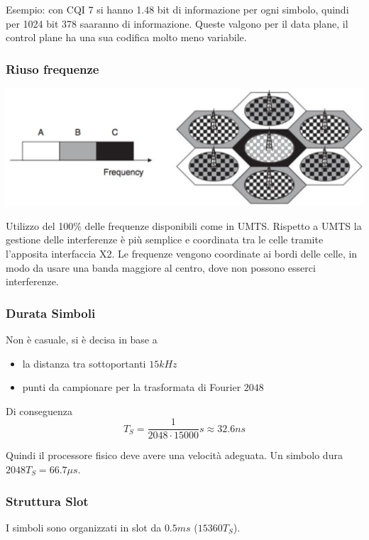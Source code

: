 Esempio: con CQI 7 si hanno 1.48 bit di informazione per ogni simbolo, quindi per 1024 bit 378 saaranno di informazione. Queste valgono per il data plane, il control plane ha una sua codifica molto meno variabile.\\

\newpage

\subsubsection{Riuso frequenze}
\begin{center}
	\includegraphics[width=0.9\linewidth]{img/mobile/riuso4g}
\end{center}
Utilizzo del 100\% delle frequenze disponibili come in UMTS.  Rispetto a UMTS la gestione delle interferenze è più semplice e coordinata tra le celle tramite l’apposita interfaccia X2. Le frequenze vengono coordinate ai bordi delle celle, in modo da usare una banda maggiore al centro, dove non possono esserci interferenze.\\

\subsubsection{Durata Simboli}

Non è casuale, si è decisa in base a
\begin{itemize}
	\item la distanza tra sottoportanti $15kHz$
	\item punti da campionare per la trasformata di Fourier $2048$
\end{itemize}

Di conseguenza
$$ T_S = \frac{1}{2048 \cdot 15000}s \approx 32.6 ns $$

Quindi il processore fisico deve avere una velocità adeguata. Un simbolo dura $2048 T_S = 66.7 \mu s$.\\

\newpage

\subsubsection{Struttura Slot}
I simboli sono organizzati in slot da $0.5ms$ ($15360 T_S$).\\

